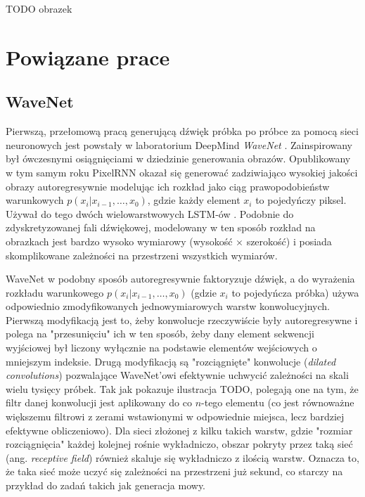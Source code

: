 \documentclass[magisterska]{pracamgr}
\renewcommand{\cite}{\citep}
\begin{document}
TODO obrazek

\section{Powiązane prace}

\subsection{WaveNet}

Pierwszą, przełomową pracą generującą dźwięk próbka po próbce za pomocą sieci neuronowych jest powstały w laboratorium DeepMind \emph{WaveNet} \cite{oord2016wavenet}. Zainspirowany był ówczesnymi osiągnięciami w dziedzinie generowania obrazów. Opublikowany w tym samym roku PixelRNN \cite{oord2016pixelrnn} okazał się generować zadziwiająco wysokiej jakości obrazy autoregresywnie modelując ich rozkład jako ciąg prawopodobieństw warunkowych $p(x_i | x_{i-1}, \ldots, x_0)$, gdzie każdy element $x_i$ to pojedyńczy piksel. Używał do tego dwóch wielowarstwowych LSTM-ów \cite{hochreiter1997lstm}. Podobnie do zdyskretyzowanej fali dźwiękowej, modelowany w ten sposób rozkład na obrazkach jest bardzo wysoko wymiarowy (wysokość $\times$ szerokość) i posiada skomplikowane zależności na przestrzeni wszystkich wymiarów.

WaveNet w podobny sposób autoregresywnie faktoryzuje dźwięk, a do wyrażenia rozkładu warunkowego $p(x_i | x_{i - 1}, \ldots, x_0)$ (gdzie $x_i$ to pojedyńcza próbka) używa odpowiednio zmodyfikowanych jednowymiarowych warstw konwolucyjnych. Pierwszą modyfikacją jest to, żeby konwolucje rzeczywiście były autoregresywne i polega na "przesunięciu" ich w ten sposób, żeby dany element sekwencji wyjściowej był liczony wyłącznie na podstawie elementów wejściowych o mniejszym indeksie. Drugą modyfikacją są "rozciągnięte" konwolucje (\textit{dilated convolutions}) pozwalające WaveNet'owi efektywnie uchwycić zależności na skali wielu tysięcy próbek. Tak jak pokazuje ilustracja TODO, polegają one na tym, że filtr danej konwolucji jest aplikowany do co $n$-tego elementu (co jest równoważne większemu filtrowi z zerami wstawionymi w odpowiednie miejsca, lecz bardziej efektywne obliczeniowo). Dla sieci złożonej z kilku takich warstw, gdzie "rozmiar rozciągnięcia" każdej kolejnej rośnie wykładniczo, obszar pokryty przez taką sieć (ang. \textit{receptive field}) również skaluje się wykładniczo z ilością warstw. Oznacza to, że taka sieć może uczyć się zależności na przestrzeni już sekund, co starczy na przykład do zadań takich jak generacja mowy.
\end{document}
